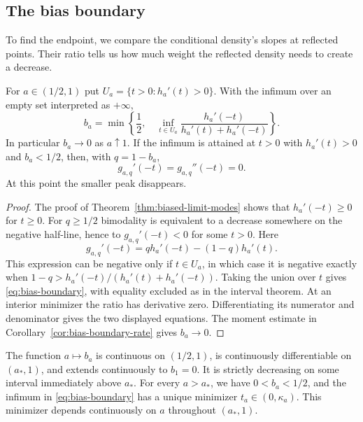 \subsection{The bias boundary}

To find the endpoint, we compare the conditional density's slopes
at reflected points. Their ratio tells us how much weight the
reflected density needs to create a decrease.

\begin{proposition}
\label{prop:bias-boundary}
For $a\in(1/2,1)$ put $U_a=\{t>0:h_a'(t)>0\}$. With the infimum
over an empty set interpreted as $+\infty$,
\begin{equation}\label{eq:bias-boundary}
 b_a=\min\left\{\frac12,\quad
       \inf_{t\in U_a}\frac{h_a'(-t)}{h_a'(t)+h_a'(-t)}\right\}.
\end{equation}
In particular $b_a\to0$ as $a\uparrow1$. If the infimum is attained
at $t>0$ with $h_a'(t)>0$ and $b_a<1/2$, then, with $q=1-b_a$,
\[
 g_{a,q}'(-t)=g_{a,q}''(-t)=0.
\]
At this point the smaller peak disappears.
\end{proposition}

\begin{proof}
The proof of Theorem~\ref{thm:biased-limit-modes} shows that
$h_a'(-t)\ge0$ for $t\ge0$. For $q\ge1/2$ bimodality is equivalent
to a decrease somewhere on the negative half-line, hence to
$g_{a,q}'(-t)<0$ for some $t>0$. Here
\[
 g_{a,q}'(-t)=q h_a'(-t)-(1-q)h_a'(t).
\]
This expression can be negative only if $t\in U_a$, in which case
it is negative exactly when
$1-q>h_a'(-t)/(h_a'(t)+h_a'(-t))$. Taking the union over $t$ gives
\eqref{eq:bias-boundary}, with equality excluded as in the interval
theorem. At an interior minimizer the ratio has derivative zero.
Differentiating its numerator and denominator gives the two displayed
equations. The moment estimate in
Corollary~\ref{cor:bias-boundary-rate} gives $b_a\to0$.
\end{proof}

\begin{theorem}\label{thm:bias-continuity}
The function $a\mapsto b_a$ is continuous on $(1/2,1)$, is continuously
differentiable on $(a_*,1)$, and extends continuously to $b_1=0$.
It is strictly decreasing on some interval immediately above $a_*$.
For every $a>a_*$, we have $0<b_a<1/2$,
and the infimum in
\eqref{eq:bias-boundary} has a unique minimizer $t_a\in(0,\kappa_a)$.
This minimizer depends continuously on $a$ throughout $(a_*,1)$.
\end{theorem}

